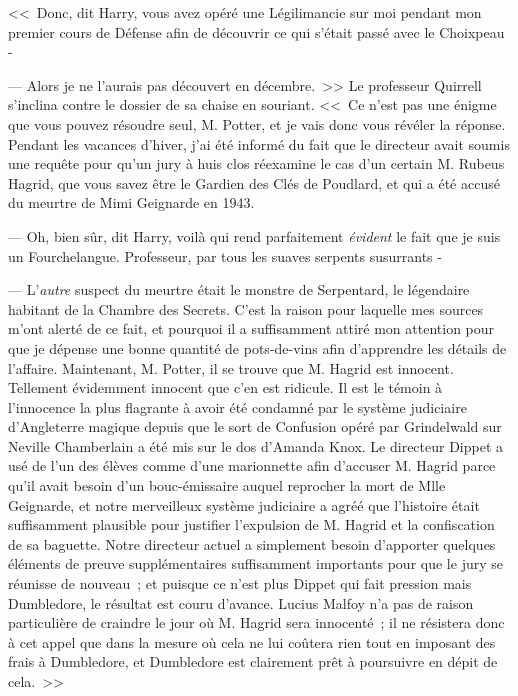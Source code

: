 <<~Donc, dit Harry, vous avez opéré une Légilimancie sur moi pendant mon premier cours de Défense afin de découvrir ce qui s'était passé avec le Choixpeau -

--- Alors je ne l'aurais pas découvert en décembre.~>> Le professeur Quirrell s'inclina contre le dossier de sa chaise en souriant. <<~Ce n'est pas une énigme que vous pouvez résoudre seul, M. Potter, et je vais donc vous révéler la réponse. Pendant les vacances d'hiver, j'ai été informé du fait que le directeur avait soumis une requête pour qu'un jury à huis clos réexamine le cas d'un certain M. Rubeus Hagrid, que vous savez être le Gardien des Clés de Poudlard, et qui a été accusé du meurtre de Mimi Geignarde en 1943.

--- Oh, bien sûr, dit Harry, voilà qui rend parfaitement \emph{évident} le fait que je suis un Fourchelangue. Professeur, par tous les suaves serpents susurrants -

--- L'\emph{autre} suspect du meurtre était le monstre de Serpentard, le légendaire habitant de la Chambre des Secrets. C'est la raison pour laquelle mes sources m'ont alerté de ce fait, et pourquoi il a suffisamment attiré mon attention pour que je dépense une bonne quantité de pots-de-vins afin d'apprendre les détails de l'affaire. Maintenant, M. Potter, il se trouve que M. Hagrid est innocent. Tellement évidemment innocent que c'en est ridicule. Il est le témoin à l'innocence la plus flagrante à avoir été condamné par le système judiciaire d'Angleterre magique depuis que le sort de Confusion opéré par Grindelwald sur Neville Chamberlain a été mis sur le dos d'Amanda Knox. Le directeur Dippet a usé de l'un des élèves comme d'une marionnette afin d'accuser M. Hagrid parce qu'il avait besoin d'un bouc-émissaire auquel reprocher la mort de Mlle Geignarde, et notre merveilleux système judiciaire a agréé que l'histoire était suffisamment plausible pour justifier l'expulsion de M. Hagrid et la confiscation de sa baguette. Notre directeur actuel a simplement besoin d'apporter quelques éléments de preuve supplémentaires suffisamment importants pour que le jury se réunisse de nouveau~; et puisque ce n'est plus Dippet qui fait pression mais Dumbledore, le résultat est couru d'avance. Lucius Malfoy n'a pas de raison particulière de craindre le jour où M. Hagrid sera innocenté~; il ne résistera donc à cet appel que dans la mesure où cela ne lui coûtera rien tout en imposant des frais à Dumbledore, et Dumbledore est clairement prêt à poursuivre en dépit de cela.~>>

